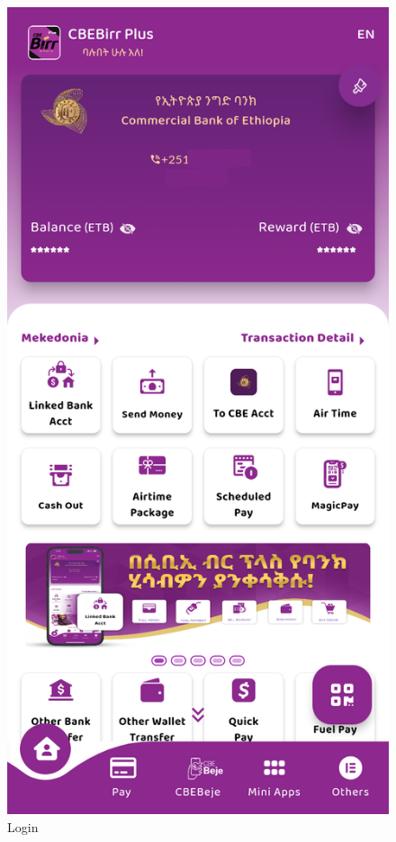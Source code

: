 \documentclass[a4paper,12pt]{report}
\begin{document}
\begin{figure}[h]
\begin{minipage}[b]{0.3\textwidth}
    \caption{Login}
  \end{minipage}
  \hfill
  \begin{minipage}[b]{0.3\textwidth}
    \includegraphics[width=\linewidth]{../images/screenshots/cbebirr/cbebirr_home.png}

\end{minipage}
\end{figure}
\end{document}
